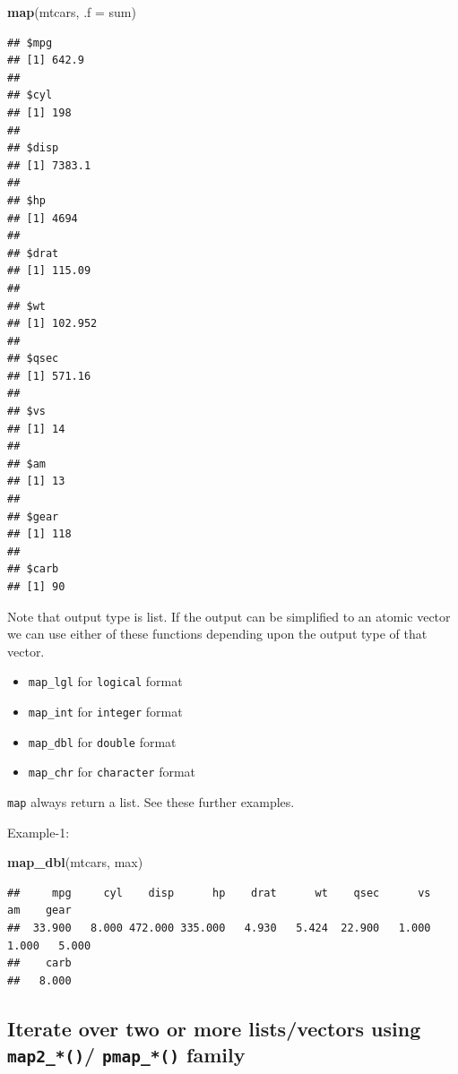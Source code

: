 \documentclass[
]{book}
\newenvironment{Shaded}{\begin{snugshade}}{\end{snugshade}}
\newcommand{\AttributeTok}[1]{\textcolor[rgb]{0.13,0.29,0.53}{#1}}
\newcommand{\FunctionTok}[1]{\textcolor[rgb]{0.13,0.29,0.53}{\textbf{#1}}}
\newcommand{\NormalTok}[1]{#1}
\providecommand{\tightlist}{%
  \setlength{\itemsep}{0pt}\setlength{\parskip}{0pt}}
\begin{document}
\begin{Shaded}
\begin{Highlighting}[]
\FunctionTok{map}\NormalTok{(mtcars, }\AttributeTok{.f =}\NormalTok{ sum)}
\end{Highlighting}
\end{Shaded}

\begin{verbatim}
## $mpg
## [1] 642.9
## 
## $cyl
## [1] 198
## 
## $disp
## [1] 7383.1
## 
## $hp
## [1] 4694
## 
## $drat
## [1] 115.09
## 
## $wt
## [1] 102.952
## 
## $qsec
## [1] 571.16
## 
## $vs
## [1] 14
## 
## $am
## [1] 13
## 
## $gear
## [1] 118
## 
## $carb
## [1] 90
\end{verbatim}

Note that output type is list. If the output can be simplified to an atomic vector we can use either of these functions depending upon the output type of that vector.

\begin{itemize}
\tightlist
\item
  \texttt{map\_lgl} for \texttt{logical} format
\item
  \texttt{map\_int} for \texttt{integer} format
\item
  \texttt{map\_dbl} for \texttt{double} format
\item
  \texttt{map\_chr} for \texttt{character} format
\end{itemize}

\texttt{map} always return a list.
See these further examples.

Example-1:

\begin{Shaded}
\begin{Highlighting}[]
\FunctionTok{map\_dbl}\NormalTok{(mtcars, max)}
\end{Highlighting}
\end{Shaded}

\begin{verbatim}
##     mpg     cyl    disp      hp    drat      wt    qsec      vs      am    gear 
##  33.900   8.000 472.000 335.000   4.930   5.424  22.900   1.000   1.000   5.000 
##    carb 
##   8.000
\end{verbatim}

\hypertarget{iterate-over-two-or-more-listsvectors-using-map2_-pmap_-family}{%
\subsection{\texorpdfstring{Iterate over two or more lists/vectors using \texttt{map2\_*()}/ \texttt{pmap\_*()} family}{Iterate over two or more lists/vectors using map2\_*()/ pmap\_*() family}}\label{iterate-over-two-or-more-listsvectors-using-map2_-pmap_-family}}
\end{document}
